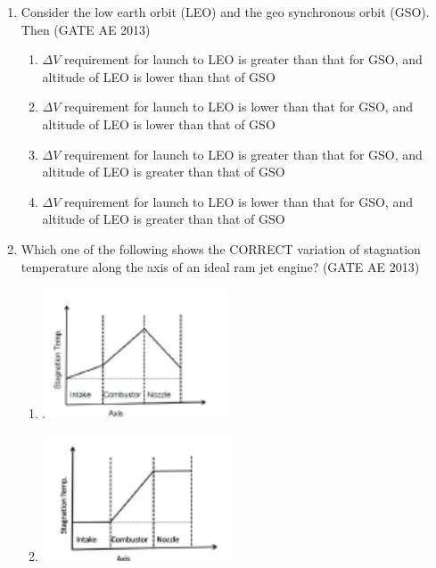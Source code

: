 \documentclass[journal,12pt,onecolumn]{IEEEtran}
\theoremstyle{remark}
\begin{document}
\begin{flushleft}
\begin{enumerate}
\item Consider the low earth orbit (LEO) and the geo synchronous orbit (GSO). Then 
\hfill(GATE AE 2013)

\begin{enumerate}
    \item $\Delta V$ requirement for launch to LEO is greater than that for GSO, and altitude of LEO is lower than that of GSO  
    \item $\Delta V$ requirement for launch to LEO is lower than that for GSO, and altitude of LEO is lower than that of GSO  
    \item $\Delta V$ requirement for launch to LEO is greater than that for GSO, and altitude of LEO is greater than that of GSO  
    \item $\Delta V$ requirement for launch to LEO is lower than that for GSO, and altitude of LEO is greater than that of GSO  
\end{enumerate}

\item Which one of the following shows the CORRECT variation of stagnation temperature along the axis of an ideal ram jet engine? 
\hfill(GATE AE 2013)

\begin{multicols}{2}
\begin{enumerate}
    \item  \includegraphics[width=0.5\columnwidth]{figs/A.png}
  
    \item \includegraphics[width=0.5\columnwidth]{figs/B.png}
    

\end{enumerate}
\end{multicols}
\end{enumerate}
\end{flushleft}
\end{document}
